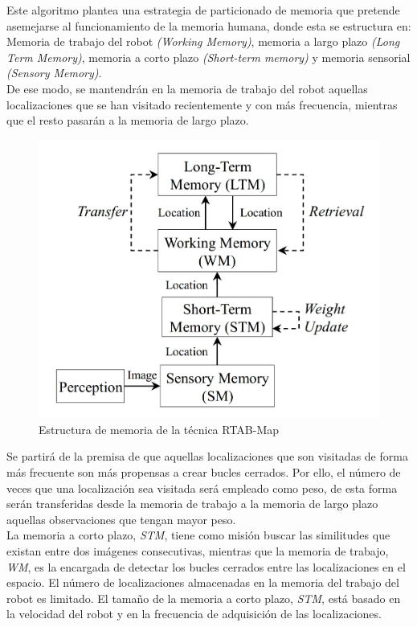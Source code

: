 Este algoritmo plantea una estrategia de particionado de memoria que pretende asemejarse al funcionamiento de la memoria humana, 
donde esta se estructura en: \\
Memoria de trabajo del robot \textit{(Working Memory)}, memoria a largo plazo \textit{(Long Term Memory)}, 
memoria a corto plazo \textit{(Short-term memory)} y memoria sensorial \textit{(Sensory Memory)}. \\
De ese modo, se mantendrán en la memoria de trabajo del robot aquellas localizaciones que se han visitado recientemente 
y con más frecuencia, mientras que el resto pasarán a la memoria de largo plazo. \\

\begin{figure}[h!]
    \centering
    \includegraphics[width=.4\textwidth]{images/rtabmap_memory}
    \caption{Estructura de memoria de la técnica RTAB-Map}
\end{figure}


Se partirá de la premisa de que aquellas localizaciones que son visitadas de forma más frecuente son más propensas a 
crear bucles cerrados. Por ello, el número de veces que una localización sea visitada será empleado como peso, de 
esta forma serán transferidas desde la memoria de trabajo a la memoria de largo plazo aquellas observaciones que 
tengan mayor peso.\\
La memoria a corto plazo, \textit{STM}, tiene como misión buscar las similitudes que existan entre dos imágenes
consecutivas, mientras que la memoria de trabajo, \textit{WM}, es la encargada de detectar los bucles cerrados entre las
localizaciones en el espacio. El número de localizaciones almacenadas en la memoria del trabajo del robot es
limitado. El tamaño de la memoria a corto plazo, \textit{STM}, está basado en la velocidad del robot y en la frecuencia de
adquisición de las localizaciones. \\

